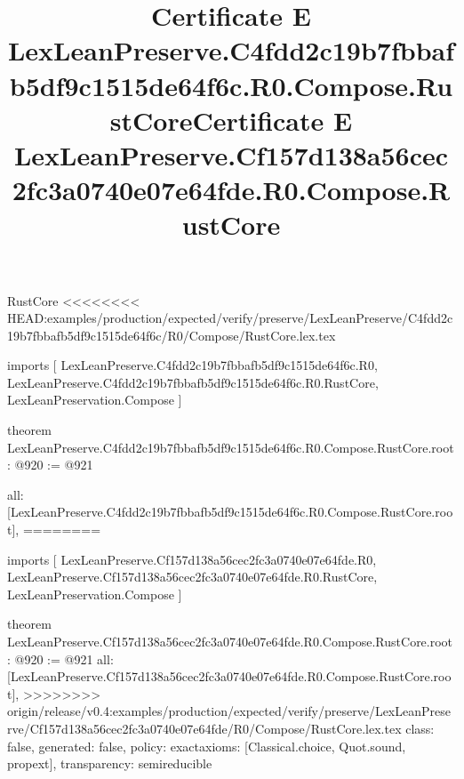 \begin{lexlean}{RustCore}
<<<<<<<< HEAD:examples/production/expected/verify/preserve/LexLeanPreserve/C4fdd2c19b7fbbafb5df9c1515de64f6c/R0/Compose/RustCore.lex.tex
\title{Certificate E LexLeanPreserve.C4fdd2c19b7fbbafb5df9c1515de64f6c.R0.Compose.RustCore}
\begin{coremodule}
imports [
  LexLeanPreserve.C4fdd2c19b7fbbafb5df9c1515de64f6c.R0,
  LexLeanPreserve.C4fdd2c19b7fbbafb5df9c1515de64f6c.R0.RustCore,
  LexLeanPreservation.Compose
]

theorem LexLeanPreserve.C4fdd2c19b7fbbafb5df9c1515de64f6c.R0.Compose.RustCore.root : @920 := @921 {
  all: [LexLeanPreserve.C4fdd2c19b7fbbafb5df9c1515de64f6c.R0.Compose.RustCore.root],
========
\title{Certificate E LexLeanPreserve.Cf157d138a56cec2fc3a0740e07e64fde.R0.Compose.RustCore}
\begin{coremodule}
imports [
  LexLeanPreserve.Cf157d138a56cec2fc3a0740e07e64fde.R0,
  LexLeanPreserve.Cf157d138a56cec2fc3a0740e07e64fde.R0.RustCore,
  LexLeanPreservation.Compose
]

theorem LexLeanPreserve.Cf157d138a56cec2fc3a0740e07e64fde.R0.Compose.RustCore.root : @920 := @921 {
  all: [LexLeanPreserve.Cf157d138a56cec2fc3a0740e07e64fde.R0.Compose.RustCore.root],
>>>>>>>> origin/release/v0.4:examples/production/expected/verify/preserve/LexLeanPreserve/Cf157d138a56cec2fc3a0740e07e64fde/R0/Compose/RustCore.lex.tex
  class: false,
  generated: false,
  policy: exact{axioms: [Classical.choice, Quot.sound, propext]},
  transparency: semireducible
}


\end{coremodule}}
\end{coremodule}
\end{lexlean}
